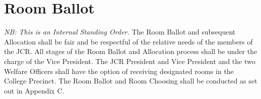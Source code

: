 \chapter{Room Ballot}
\textit{NB: This is an Internal Standing Order.}
\npara The Room Ballot and subsequent Allocation shall be fair and be respectful of the relative needs of the members of the JCR.
\npara All stages of the Room Ballot and Allocation process shall be under the charge of the Vice President.
\npara The JCR President and Vice President and the two Welfare Officers shall have the option of receiving designated rooms in the College Precinct.
\npara The Room Ballot and Room Choosing shall be conducted as set out in Appendix C.
